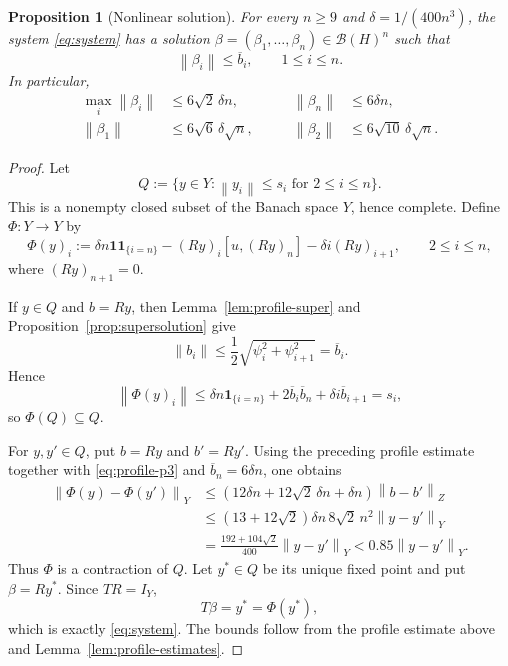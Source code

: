 \documentclass[11pt]{amsart}
\numberwithin{equation}{section}
\newtheorem{proposition}[proposition]{Proposition}
\theoremstyle{remark}
\newcommand{\one}{\mathbf 1}
\newcommand{\norm}[1]{\left\lVert #1\right\rVert}
\newcommand{\ind}[1]{\mathbf 1_{\{#1\}}}
\begin{document}
\begin{proposition}[Nonlinear solution]\label{prop:nonlinear-solution}
For every $n\geq9$ and $\delta=1/(400n^3)$, the system
\eqref{eq:system} has a solution
$\beta=(\beta_1,\ldots,\beta_n)\in\mathcal B(H)^n$ such that
\begin{equation}\label{eq:beta-bounds}
 \norm{\beta_i}\leq\overline b_i,
 \qquad 1\leq i\leq n.
\end{equation}
In particular,
\begin{equation}\label{eq:beta-consequences}
 \begin{aligned}
 \max_i\norm{\beta_i}&\leq6\sqrt2\,\delta n,
 &\qquad \norm{\beta_n}&\leq6\delta n,\\
 \norm{\beta_1}&\leq6\sqrt6\,\delta\sqrt n,
 &\qquad \norm{\beta_2}&\leq6\sqrt{10}\,\delta\sqrt n.
 \end{aligned}
\end{equation}
\end{proposition}

\begin{proof}
Let
\[
 Q:=\{y\in Y:\norm{y_i}\leq s_i\text{ for }2\leq i\leq n\}.
\]
This is a nonempty closed subset of the Banach space $Y$, hence complete.
Define $\Phi:Y\to Y$ by
\begin{equation}\label{eq:Phi}
 \Phi(y)_i
 :=\delta n\one\ind{i=n}
 -(Ry)_i[u,(Ry)_n]
 -\delta i(Ry)_{i+1},
 \qquad 2\leq i\leq n,
\end{equation}
where $(Ry)_{n+1}=0$.

If $y\in Q$ and $b=Ry$, then
Lemma~\ref{lem:profile-super} and Proposition~\ref{prop:supersolution} give
\[
 \norm{b_i}
 \leq\frac12\sqrt{\psi_i^2+\psi_{i+1}^2}
 =\overline b_i.
\]
Hence
\[
 \norm{\Phi(y)_i}
 \leq\delta n\ind{i=n}
 +2\overline b_i\overline b_n
 +\delta i\overline b_{i+1}
 =s_i,
\]
so $\Phi(Q)\subseteq Q$.

For $y,y'\in Q$, put $b=Ry$ and $b'=Ry'$.  Using the preceding
profile estimate together with \eqref{eq:profile-p3} and
$\overline b_n=6\delta n$, one obtains
\begin{align*}
 \norm{\Phi(y)-\Phi(y')}_Y
 &\leq(12\delta n+12\sqrt2\,\delta n+\delta n)
 \norm{b-b'}_Z\\
 &\leq(13+12\sqrt2)\delta n\,
 8\sqrt2\,n^2\norm{y-y'}_Y\\
 &=\frac{192+104\sqrt2}{400}\norm{y-y'}_Y
 <0.85\norm{y-y'}_Y.
\end{align*}
Thus $\Phi$ is a contraction of $Q$.  Let $y^*\in Q$ be its unique fixed
point and put $\beta=Ry^*$.  Since $TR=I_Y$,
\[
 T\beta=y^*=\Phi(y^*),
\]
which is exactly \eqref{eq:system}.  The bounds follow from the profile
estimate above and Lemma~\ref{lem:profile-estimates}.
\end{proof}
\end{document}
